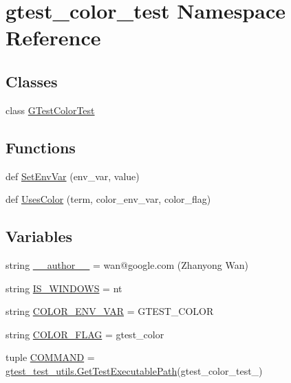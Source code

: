 \hypertarget{namespacegtest__color__test}{}\section{gtest\+\_\+color\+\_\+test Namespace Reference}
\label{namespacegtest__color__test}
\subsection*{Classes}
\begin{DoxyCompactItemize}
\item 
class \hyperlink{classgtest__color__test_1_1_g_test_color_test}{G\+Test\+Color\+Test}
\end{DoxyCompactItemize}
\subsection*{Functions}
\begin{DoxyCompactItemize}
\item 
def \hyperlink{namespacegtest__color__test_af8659dcaaf59478690f30d7ac141b1c4}{Set\+Env\+Var} (env\+\_\+var, value)
\item 
def \hyperlink{namespacegtest__color__test_a96a2e5fa77bff1cba4a791ad1e5bdafa}{Uses\+Color} (term, color\+\_\+env\+\_\+var, color\+\_\+flag)
\end{DoxyCompactItemize}
\subsection*{Variables}
\begin{DoxyCompactItemize}
\item 
string \hyperlink{namespacegtest__color__test_aed3212d01eb48ec3b2ce43de461f9e84}{\+\_\+\+\_\+author\+\_\+\+\_\+} = \textquotesingle{}wan@google.\+com (Zhanyong Wan)\textquotesingle{}
\item 
string \hyperlink{namespacegtest__color__test_a0d4451a99f88105308f0842eb3ec2938}{I\+S\+\_\+\+W\+I\+N\+D\+O\+W\+S} = \textquotesingle{}nt\textquotesingle{}
\item 
string \hyperlink{namespacegtest__color__test_aa6deaa7da27bcc115fe666abad13419c}{C\+O\+L\+O\+R\+\_\+\+E\+N\+V\+\_\+\+V\+A\+R} = \textquotesingle{}G\+T\+E\+S\+T\+\_\+\+C\+O\+L\+O\+R\textquotesingle{}
\item 
string \hyperlink{namespacegtest__color__test_af5818cea608c0551909fefbeaf0edf20}{C\+O\+L\+O\+R\+\_\+\+F\+L\+A\+G} = \textquotesingle{}gtest\+\_\+color\textquotesingle{}
\item 
tuple \hyperlink{namespacegtest__color__test_aeea73d02198b607c38e9dccb97235322}{C\+O\+M\+M\+A\+N\+D} = \hyperlink{namespacegtest__test__utils_a1bdf3cac86afa675ed37629b183048e9}{gtest\+\_\+test\+\_\+utils.\+Get\+Test\+Executable\+Path}(\textquotesingle{}gtest\+\_\+color\+\_\+test\+\_\+\textquotesingle{})
\end{DoxyCompactItemize}



